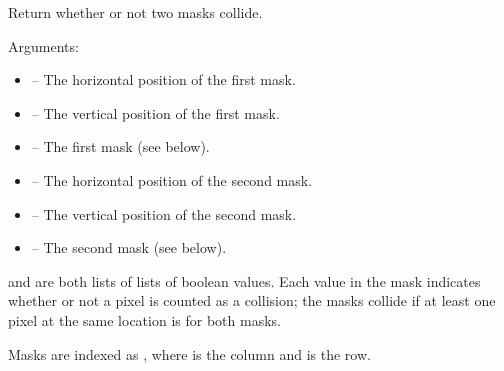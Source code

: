 \documentclass[letterpaper,10pt,english]{sphinxmanual}
\begin{document}
\begin{fulllineitems}
\label{collision:sge.collision.masks_collide}
Return whether or not two masks collide.

Arguments:
\begin{itemize}
\item {} 
 -- The horizontal position of the first mask.

\item {} 
 -- The vertical position of the first mask.

\item {} 
 -- The first mask (see below).

\item {} 
 -- The horizontal position of the second mask.

\item {} 
 -- The vertical position of the second mask.

\item {} 
 -- The second mask (see below).

\end{itemize}

 and  are both lists of lists of boolean values.
Each value in the mask indicates whether or not a pixel is counted
as a collision; the masks collide if at least one pixel at the same
location is  for both masks.

Masks are indexed as , where  is the column and
 is the row.

\end{fulllineitems}

\end{document}
